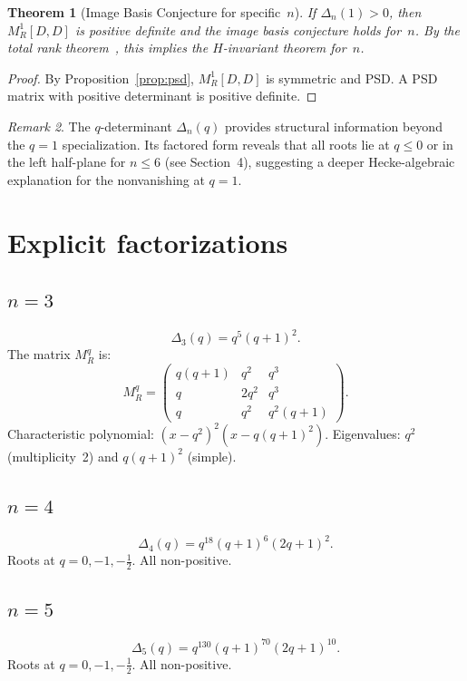 \documentclass[11pt]{article}
\newtheorem{theorem}{Theorem}
\theoremstyle{definition}
\theoremstyle{remark}
\newtheorem{remark}[theorem]{Remark}
\begin{document}
\begin{theorem}[Image Basis Conjecture for specific~$n$]\label{thm:qdet}
If $\Delta_n(1) > 0$, then $M_R^1[D,D]$ is positive definite
and the image basis conjecture holds for~$n$.
By the total rank theorem~\cite{Clio-TotalRank}, this implies
the $H$-invariant theorem for~$n$.
\end{theorem}

\begin{proof}
By Proposition~\ref{prop:psd}, $M_R^1[D,D]$ is symmetric and PSD.
A PSD matrix with positive determinant is positive definite.
\end{proof}

\begin{remark}
The $q$-determinant $\Delta_n(q)$ provides structural information
beyond the $q=1$ specialization.
Its factored form reveals that all roots lie at $q \leq 0$
or in the left half-plane for $n \leq 6$ (see Section~4),
suggesting a deeper Hecke-algebraic explanation for the
nonvanishing at $q = 1$.
\end{remark}

\section{Explicit factorizations}

\subsection{$n = 3$}
\[
  \Delta_3(q) = q^5 (q+1)^2.
\]
The matrix $M_R^q$ is:
\[
  M_R^q = \begin{pmatrix} q(q+1) & q^2 & q^3 \\ q & 2q^2 & q^3 \\ q & q^2 & q^2(q+1) \end{pmatrix}.
\]
Characteristic polynomial: $(x - q^2)^2(x - q(q+1)^2)$.
Eigenvalues: $q^2$ (multiplicity~2) and $q(q+1)^2$ (simple).

\subsection{$n = 4$}
\[
  \Delta_4(q) = q^{18} (q+1)^6 (2q+1)^2.
\]
Roots at $q = 0, -1, -\tfrac{1}{2}$.  All non-positive.

\subsection{$n = 5$}
\[
  \Delta_5(q) = q^{130} (q+1)^{70} (2q+1)^{10}.
\]
Roots at $q = 0, -1, -\tfrac{1}{2}$.  All non-positive.
\end{document}
